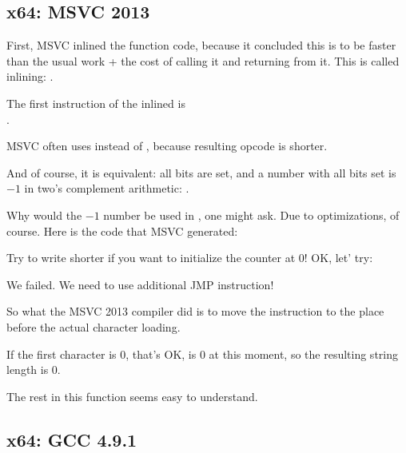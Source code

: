 ﻿\subsection{x64: \Optimizing MSVC 2013}



First, MSVC inlined the \strlen{} function code, because it concluded this 
is to be faster than the usual \strlen{} work + the cost of calling it and returning from it.
This is called inlining: .

\label{using_OR_instead_of_MOV}
The first instruction of the inlined \strlen{} is\\
. 

MSVC often uses  instead of , because resulting opcode is shorter.

And of course, it is equivalent: all bits are set, and a number with all bits set is $-1$ 
in two's complement arithmetic: .

Why would the $-1$ number be used in \strlen{}, one might ask.
Due to optimizations, of course.
Here is the code that MSVC generated:



Try to write shorter if you want to initialize the counter at 0!
OK, let' try:



We failed. We need to use additional JMP instruction!

So what the MSVC 2013 compiler did is to move the  instruction to the place before 
the actual character loading.

If the first character is 0, that's OK, \RAX is 0 at this moment, 
so the resulting string length is 0.

The rest in this function seems easy to understand.

\subsection{x64: \NonOptimizing GCC 4.9.1}



